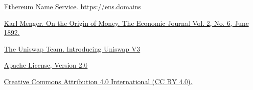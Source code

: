 \documentclass{article}
\begin{document}
\begin{thebibliography}{2}
 \href{https://ens.domains/}{Ethereum Name Service. https://ens.domains}

 \href{https://www.jstor.org/stable/2956146}{Karl Menger. On the Origin of Money. The Economic Journal Vol. 2, No. 6, June 1892.}

 \href{https://uniswap.org/blog/uniswap-v3/}{The Uniswap Team. Introducing Uniswap V3}

 \href{https://www.apache.org/licenses/LICENSE-2.0}{Apache License, Version 2.0}

 \href{https://creativecommons.org/licenses/by/4.0/}{Creative Commons Attribution 4.0 International (CC BY 4.0).}

\end{thebibliography}
\end{document}
